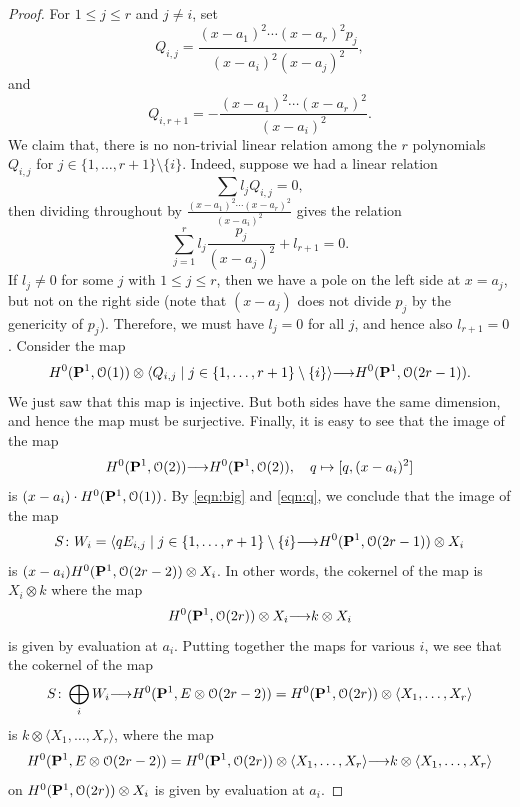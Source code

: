 \documentclass[11pt,reqno]{amsart}
\theoremstyle{plain}
\theoremstyle{definition}
\theoremstyle{remark}
\numberwithin{equation}{section}
\renewcommand{\k}{k}
\renewcommand{\to}{{\longrightarrow}}
\numberwithin{equation}{section}
\renewcommand{\O}{\mathcal O}
\begin{document}
\begin{proof}
  For $1 \leq j \leq r$ and $j \neq i$, set
  \[
    Q_{i,j} = \frac{(x-a_1)^2 \cdots (x-a_r)^2p_j}{(x-a_i)^2(x-a_j)^2}, 
  \]
  and
  \[
    Q_{i,r+1} = - \frac{(x-a_1)^2 \cdots (x-a_r)^2}{(x-a_i)^2}.
  \]
  We claim that, there is no non-trivial linear relation among the $r$ polynomials $Q_{i,j}$ for $j \in \{1, \dots, r+1\} \setminus \{i\}$.
  Indeed, suppose we had a linear relation
  \[ \sum l_j Q_{i,j} = 0,\]
  then dividing throughout by $\frac{(x-a_1)^2\cdots (x-a_r)^2}{(x-a_i)^2}$ gives the relation
  \[ \sum_{j = 1}^r l_j \frac{p_j}{(x-a_j)^2} + l_{r+1} = 0.\]
  If $l_j \neq 0$ for some $j$ with $1 \leq j \leq r$, then we have a pole on the left side at $x = a_j$, but not on the right side (note that $(x-a_j)$ does not divide $p_j$ by the genericity of $p_j$).
  Therefore, we must have $l_j = 0$ for all $j$, and hence also $l_{r+1} = 0$.
  Consider the map
  \begin{equation}\label{eqn:big}
    H^0(\P^1, \O(1)) \otimes \langle  Q_{i,j} \mid j \in \{1, \dots, r+1\} \setminus \{i\}\rangle \to H^0(\P^1, \O(2r-1)).
  \end{equation}
  We just saw that this map is injective.
  But both sides have the same dimension, and hence the map must be surjective.
  Finally, it is easy to see that the image of the map
  \begin{equation}\label{eqn:q}
    H^0(\P^1, \O(2)) \to H^0(\P^1, \O(2)), \quad q \mapsto [q, (x-a_i)^2]
  \end{equation}
  is $(x-a_i)\cdot H^0(\P^1, \O(1))$.
  By \eqref{eqn:big} and \eqref{eqn:q}, we conclude that the image of the map
  \[ S \from W_i = \langle qE_{i,j} \mid j \in\{1, \dots, r+1\} \setminus \{i\} \to H^0(\P^1, \O(2r-1)) \otimes X_i\]
  is $(x-a_i)H^0(\P^1, \O(2r-2)) \otimes X_i$.
  In other words, the cokernel of the map is $X_i \otimes \k$ where the map
  \[H^0(\P^1, \O(2r)) \otimes X_i \to \k \otimes X_i \]
  is given by evaluation at $a_i$.
  Putting together the maps for various $i$, we see that the cokernel of the map
  \[ S \from \bigoplus_i W_i \to H^0(\P^1, E \otimes \O(2r-2)) = H^0(\P^1, \O(2r)) \otimes \langle  X_1, \dots, X_r \rangle\]
  is $\k \otimes \langle  X_1, \dots, X_r \rangle$, where the map
  \begin{equation}\label{eqn:partialsur}
    H^0(\P^1, E \otimes \O(2r-2)) = H^0(\P^1, \O(2r)) \otimes \langle  X_1, \dots, X_r \rangle \to \k \otimes \langle  X_1, \dots, X_r \rangle
  \end{equation}
  on $H^0(\P^1, \O(2r)) \otimes X_i$ is given by evaluation at $a_i$.


\end{proof}
\end{document}
